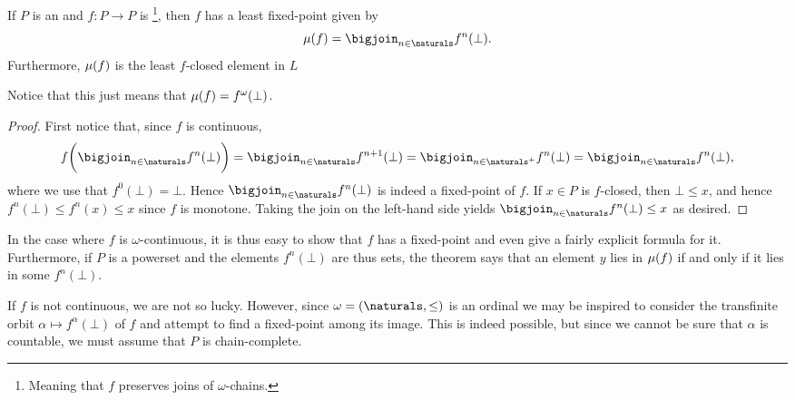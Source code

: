 
\begin{theorem}
    \label{thm:Kleene-I}
    If $P$ is an \oCPPO{} and $f \colon P \to P$ is \footnote{Meaning that $f$ preserves joins of $\omega$-chains.}, then $f$ has a least fixed-point given by
    \begin{equation*}
        \lfp{f}
            = \bigjoin_{n \in \naturals} f^n(\bot).
    \end{equation*}
    Furthermore, $\lfp{f}$ is the least $f$-closed element in $L$
\end{theorem}
%
Notice that this just means that $\lfp{f} = f^\omega(\bot)$.

\begin{proof}
    First notice that, since $f$ is continuous,
    \begin{equation*}
        f \biggl( \bigjoin_{n \in \naturals} f^n(\bot) \biggr)
            = \bigjoin_{n \in \naturals} f^{n+1}(\bot)
            = \bigjoin_{n \in \naturals^+} f^n(\bot)
            = \bigjoin_{n \in \naturals} f^n(\bot),
    \end{equation*}
    where we use that $f^0(\bot) = \bot$. Hence $\bigjoin_{n \in \naturals} f^n(\bot)$ is indeed a fixed-point of $f$. If $x \in P$ is $f$-closed, then $\bot \leq x$, and hence $f^n(\bot) \leq f^n(x) \leq x$ since $f$ is monotone. Taking the join on the left-hand side yields $\bigjoin_{n \in \naturals} f^n(\bot) \leq x$ as desired.
\end{proof}
%
In the case where $f$ is $\omega$-continuous, it is thus easy to show that $f$ has a fixed-point and even give a fairly explicit formula for it. Furthermore, if $P$ is a powerset and the elements $f^n(\bot)$ are thus sets, the theorem says that an element $y$ lies in $\lfp{f}$ if and only if it lies in some $f^n(\bot)$.

If $f$ is not continuous, we are not so lucky. However, since $\omega = (\naturals,\leq)$ is an ordinal we may be inspired to consider the transfinite orbit $\alpha \mapsto f^\alpha(\bot)$ of $f$ and attempt to find a fixed-point among its image. This is indeed possible, but since we cannot be sure that $\alpha$ is countable, we must assume that $P$ is chain-complete.

